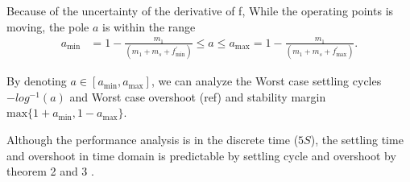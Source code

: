 Because of the uncertainty of the derivative of f, While the operating points is moving, the pole $a$ is within the range
\begin{align}
a_{\text{min}} &= 1 - \frac{m_1}{(m_1 + m_s + f^{'}_{\text{min}})} \le a \le   a_{\text{max}} = 1 - \frac{m_1}{(m_1 + m_s + f^{'}_{\text{max}})}.
\end{align}

By denoting $a \in [a_{\text{min}}, a_{\text{max}}]$, 
we can analyze the Worst case settling cycles $-log^{-1}(a)$ and Worst case overshoot (ref) and stability margin $\text{max} \{1+a_{\text{min}}, 1-a_{\text{max}}\}$.

Although the performance analysis is in the discrete time ($5S$), the settling time and overshoot in time domain is predictable by settling cycle and overshoot by theorem 2 and 3 \cite{Cui2018a}.


